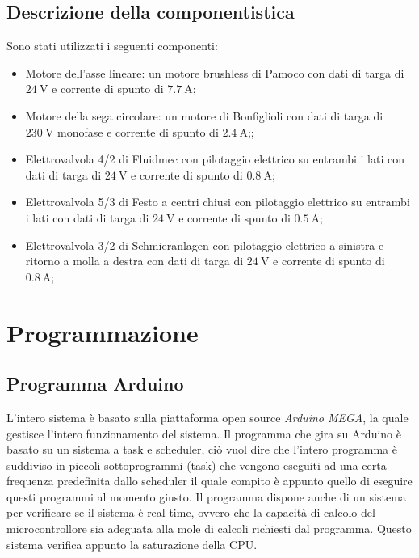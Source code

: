 \documentclass{report}
\begin{document}
\section{Descrizione della componentistica}
Sono stati utilizzati i seguenti componenti:
\begin{itemize}
\item Motore dell'asse lineare: un motore brushless di Pamoco con dati di targa di $\SI{24}{\volt}$ e corrente di spunto di $\SI{7,7}{\ampere}$;
\item Motore della sega circolare: un motore di Bonfiglioli con dati di targa di $\SI{230}{\volt}$ monofase e corrente di spunto di $\SI{2,4}{\ampere}$;;
\item Elettrovalvola 4/2 di Fluidmec con pilotaggio elettrico su entrambi i lati con dati di targa di $\SI{24}{\volt}$ e corrente di spunto di $\SI{0,8}{\ampere}$; 
\item Elettrovalvola 5/3 di Festo a centri chiusi con pilotaggio elettrico su entrambi i lati con dati di targa di $\SI{24}{\volt}$ e corrente di spunto di $\SI{0,5}{\ampere}$;
\item Elettrovalvola 3/2 di Schmieranlagen con pilotaggio elettrico a sinistra e ritorno a molla a destra con dati di targa di $\SI{24}{\volt}$ e corrente di spunto di $\SI{0,8}{\ampere}$;
\end{itemize} 

\chapter{Programmazione}
\section{Programma Arduino}
L'intero sistema è basato sulla piattaforma open source \emph{Arduino MEGA}, la quale gestisce l'intero funzionamento del sistema. Il programma che gira su Arduino è basato su un sistema a task e scheduler, ciò vuol dire che l'intero programma è suddiviso in piccoli sottoprogrammi (task) che vengono eseguiti ad una certa frequenza predefinita dallo scheduler il quale compito è appunto quello di eseguire questi programmi al momento giusto. Il programma dispone anche di un sistema per verificare se il sistema è real-time, ovvero che la capacità di calcolo del microcontrollore sia adeguata alla mole di calcoli richiesti dal programma. Questo sistema verifica appunto la saturazione della CPU.
\end{document}
